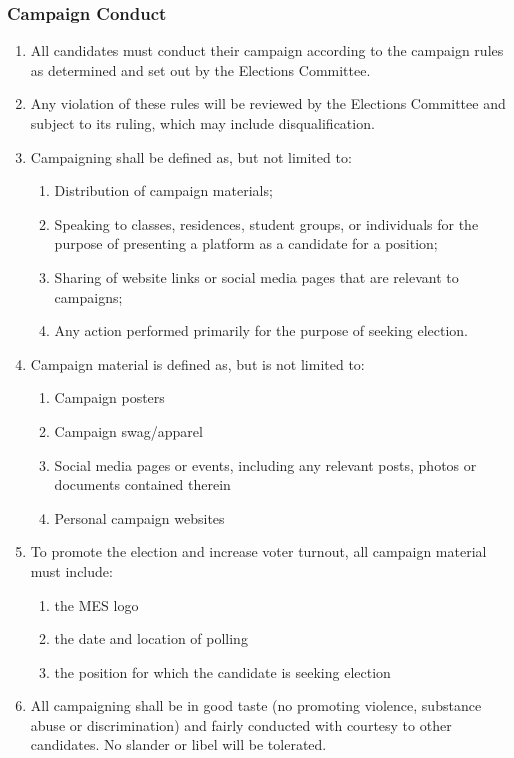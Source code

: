 \subsubsection{Campaign Conduct}
\label{campaign-conduct}
\begin{enumerate}
 \item
  All candidates must conduct their campaign according to the campaign
  rules as determined and set out by the Elections Committee.
 \item
  Any violation of these rules will be reviewed by the Elections
  Committee and subject to its ruling, which may include
  disqualification.
 \item
  Campaigning shall be defined as, but not limited to:

  \begin{enumerate}
   \item
    Distribution of campaign materials;
   \item
    Speaking to classes, residences, student groups, or individuals for
    the purpose of presenting a platform as a candidate for a position;
   \item
    Sharing of website links or social media pages that are relevant to
    campaigns;
   \item
    Any action performed primarily for the purpose of seeking election.
  \end{enumerate}
 \item
  Campaign material is defined as, but is not limited to:

  \begin{enumerate}
   \item
    Campaign posters
   \item
    Campaign swag/apparel
   \item
    Social media pages or events, including any relevant posts, photos
    or documents contained therein
   \item
    Personal campaign websites
  \end{enumerate}
 \item
  To promote the election and increase voter turnout, all campaign
  material must include:

  \begin{enumerate}
   \item
    the MES logo
   \item
    the date and location of polling
   \item
    the position for which the candidate is seeking election
  \end{enumerate}
 \item
  All campaigning shall be in good taste (no promoting violence,
  substance abuse or discrimination) and fairly conducted with courtesy
  to other candidates. No slander or libel will be tolerated.

\end{enumerate}


